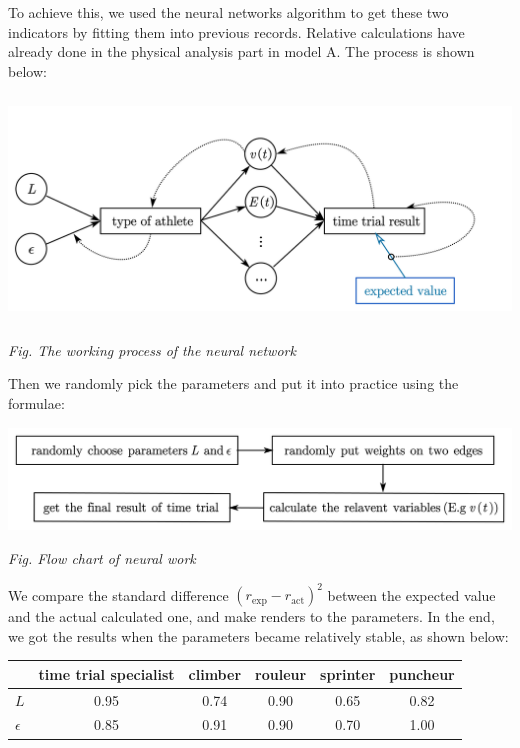 \documentclass[12pt]{article}
\theoremstyle{definition}
\theoremstyle{remark}
\numberwithin{equation}{section}
\begin{document}
	To achieve this, we used the neural networks algorithm to get these two indicators by fitting them into previous records. Relative calculations have already done in the physical analysis part in model A. The process is shown below:

	\begin{center}
		\includegraphics[height = 6cm]{10.png}

		\small\textit{Fig. The working process of the neural network}
	\end{center}

	Then we randomly pick the parameters and put it into practice using the formulae:

	\begin{center}
		\includegraphics[width=15cm]{12.png}

		\small \textit{Fig. Flow chart of neural work}
	\end{center}

	We compare the standard difference \(\left( r_{\exp}-r_{\mathrm{act}} \right) ^2\) between the expected value and the actual calculated one, and make renders to the parameters. In the end, we got the results when the parameters became relatively stable, as shown below:

			\begin{center}
				\begin{tabular}{|l||c|c|c|c|c|}
					\hline
					&\textbf{time trial specialist} & \textbf{climber} & \textbf{rouleur} & \textbf{sprinter} & \textbf{puncheur} \\
					\hline
					\(L\) & 0.95 & 0.74 & 0.90 & 0.65 & 0.82 \\
					\hline
					\(\epsilon\) & 0.85 & 0.91 & 0.90 & 0.70 & 1.00 \\
					\hline
				\end{tabular}
			\end{center}
\end{document}
